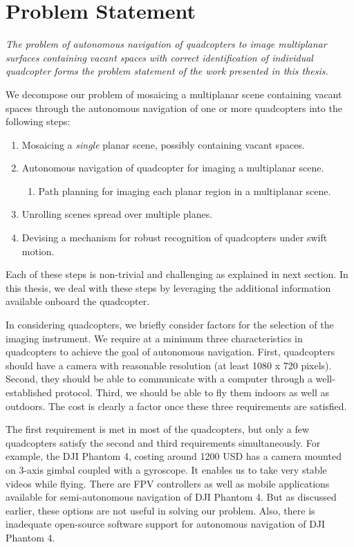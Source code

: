 \section*{Problem Statement}
\textit{The problem of autonomous navigation of quadcopters to image
  multiplanar surfaces containing vacant spaces with correct
  identification of individual quadcopter forms the problem statement
  of the work presented in this thesis.}

We decompose our problem of mosaicing a multiplanar scene containing
vacant spaces through the autonomous navigation of one or more
quadcopters into the following steps:
\begin{enumerate}
  \item Mosaicing a \textit{single} planar scene, possibly containing vacant
  spaces.
  \item Autonomous navigation of quadcopter for imaging a multiplanar scene.
	\begin{enumerate}
  		\item Path planning for imaging each planar region in a multiplanar scene.
	\end{enumerate}
  \item Unrolling scenes spread over multiple planes.
  \item Devising a mechanism for robust recognition of quadcopters under swift
  motion.
\end{enumerate}
Each of these steps is non-trivial and challenging as explained in
next section. In this thesis, we deal with these steps by leveraging
the additional information available onboard the quadcopter.

In considering quadcopters, we briefly consider factors for the selection of
the imaging instrument. We require at a minimum three characteristics in
quadcopters to achieve the goal of autonomous navigation. First, quadcopters
should have a camera with reasonable resolution (at least 1080 x 720
pixels). Second, they should be able to communicate with a computer
through a well-established protocol. Third, we should be able to fly
them indoors as well as outdoors. The cost is clearly a factor once
these three requirements are satisfied.

The first requirement is met in most of the quadcopters, but only a
few quadcopters satisfy the second and third requirements
simultaneously. For example, the DJI Phantom 4, costing around 1200
USD has a camera mounted on 3-axis gimbal coupled with a gyroscope. It
enables us to take very stable videos while flying. There are FPV
controllers as well as mobile applications available for
semi-autonomous navigation of DJI Phantom 4. But as discussed earlier,
these options are not useful in solving our problem.  Also, there is
inadequate open-source software support for autonomous navigation of
DJI Phantom 4.

